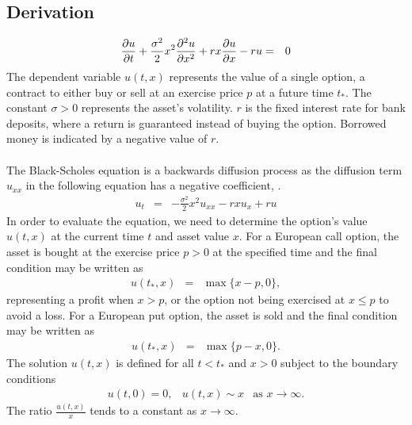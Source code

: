 \documentclass{article}
\newcommand{\bea}{\begin{eqnarray*}}
\newcommand{\eea}{\end{eqnarray*}}
\newcommand{\pp}[2]{{\partial #1 \over \partial #2}}
\newcommand{\ppn}[3]{{\partial^{#1} #2 \over \partial #3^{#1}}}
\begin{document}
\subsection{Derivation}
\bea
\pp{u}{t}+\frac{\sigma^2}{2} x^2 \ppn{2}{u}{x}+rx\pp{u}{x}-ru &=& 0
\eea
The dependent variable $u(t,x)$ represents the value of a single option, a contract to either buy or sell at an exercise price $p$ at a future time $t_*$.
The constant $\sigma>0$ represents the asset's volatility. $r$ is the fixed interest rate for bank deposits, where a return is guaranteed instead of buying the option. Borrowed money is indicated by a negative value of $r$.\\\\
The Black-Scholes equation is a backwards diffusion process as the diffusion term $u_{xx}$ in the following equation has a negative coefficient, \cite{textbook}.
\bea
u_t &=& -\frac{\sigma^2}{2} x^2 u_{xx} -rxu_x +ru
\eea
In order to evaluate the equation, we need to determine the option's value $u(t,x)$ at the current time $t$ and asset value $x$. For a European call option, the asset is bought at the exercise price $p>0$ at the specified time and the final condition may be written as
\bea
u(t_*,x) &=& \max\{x-p,0\},
\eea
representing a profit when $x>p$, or the option not being exercised at $x\leq p$ to avoid a loss. For a European put option, the asset is sold and the final condition may be written as
\bea
u(t_*,x) &=& \max\{p-x,0\}.
\eea
The solution $u(t,x)$ is defined for all $t<t_*$ and $x>0$ subject to the boundary conditions
\bea
u(t,0) = 0, & u(t,x) \sim x & \text{as  }  x \rightarrow \infty.
\eea
The ratio $\frac{u(t,x)}{x}$ tends to a constant as $x \rightarrow \infty$.\\
\end{document}
